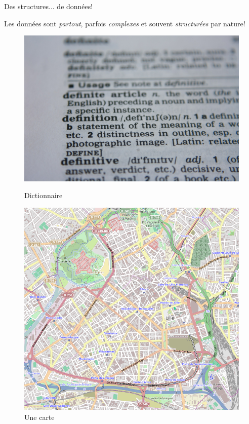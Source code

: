 \documentclass[12pt,a4paper,handout]{beamer}
\begin{document}
\begin{frame}{Des structures...}
{de données!}

Les données sont \textit{partout}, parfois \textit{complexes} et souvent \textit{structurées} par nature!
        \pause

 \begin{figure}
        \centering
        \begin{minipage}{.50\textwidth}
            \centering
            \includegraphics[width=0.9\linewidth]{figs/dico.jpg}
          \caption{Dictionnaire}
        \end{minipage}%
        \pause
        \begin{minipage}{.50\textwidth}
            \centering
            \includegraphics[width=0.8\linewidth]{figs/map.png}
            \caption{Une carte}
        \end{minipage}
  
    \end{figure}



\end{frame}
\end{document}
